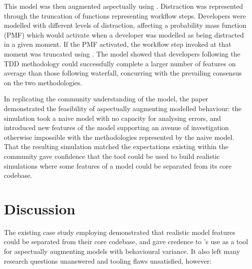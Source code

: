 This model was then augmented aspectually using \pdsf{}. Distraction was
represented through the truncation of functions representing workflow steps.
Developers were modelled with different levels of distraction, affecting a
probability mass function (PMF) which would activate when a developer was
modelled as being distracted in a given moment. If the PMF activated, the
workflow step invoked at that moment was truncated using \pdsf{}. The model showed
that developers following the TDD methodology could successfully complete a
larger number of features on average than those following waterfall, concurring
with the prevailing consensus on the two methodologies. 

In replicating the community understanding of the model, the paper demonstrated
the feasibility of aspectually augmenting modelled behaviour: the simulation
took a naive model with no capacity for analysing errors, and introduced new
features of the model supporting an avenue of investigation otherwise
impossible with the methodologies represented by the naive model. That the
resulting simulation matched the expectations existing within the community gave
confidence that the tool could be used to build realistic simulations where
some features of a model could be separated from its core codebase.


\section{Discussion}\label{sec:prior_work_discussion}

The existing case study employing \pdsf demonstrated that realistic model
features could be separated from their core codebase, and gave credence to
\pdsf{}'s use as a tool for aspectually augmenting models with behavioural
variance. It also left many research questions unanswered and tooling
flaws unsatisfied, however:

